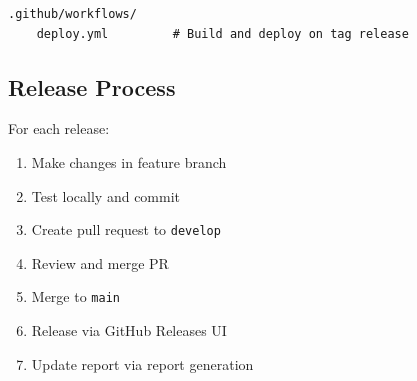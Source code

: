 \begin{verbatim}
.github/workflows/
    deploy.yml         # Build and deploy on tag release
\end{verbatim}

\subsection{Release Process}

For each release:
\begin{enumerate}
    \item Make changes in feature branch
    \item Test locally and commit
    \item Create pull request to \texttt{develop}
    \item Review and merge PR
    \item Merge to \texttt{main}
    \item Release via GitHub Releases UI
    \item Update report via report generation
\end{enumerate}
